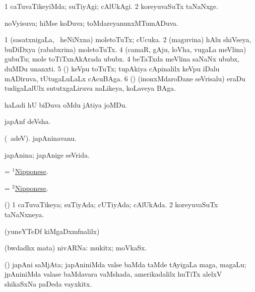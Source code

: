 \bentry
{}
\gl{\kirxvi}
\bmng
\bnum
\num{1} caTuvaTikeyiMda; suTiyAgi; cAlUkAgi. 
\num{2} koreyuvaSuTx taNaNxge. 
\enum
\emng
\eentry

\bentry
{}
\gl{\gu}
\bmng
noVyisuva; hiMse koDuva; toMdareyanunxMTumADuva. 
\emng
\eentry

\bentry
{}
\gl{\nA}
\bmng
\bnum
\num{1} (sasatxnigaLa, \kanmu\ heNiNxna) moletoTuTx; cUcuka. 
\num{2} (maguvina) hAlu shiVseya, buDiDxya (rababxrina) moletoTuTx. 
\num{4} (camaR, gAju, loVha, \mo vugaLa meVlina) gubuTu; mole toTiTxnAkArada ububx. 
\num{4} beTaTxda meVlina saNaNx ububx, duMDu unanxti. 
\num{5} (\ca) keVpu toTuTx; tupAkiya cApinalilx keVpu iDalu mADiruva, tUtugaLuLaLx cAcuBAga. 
\num{6} (\ame) (inonxMdaroDane seVrisalu) eraDu tudigaLalUlx sututxgaLiruva naLikeya, koLaveya BAga. 
\enum
\emng
\eentry

\bentry
{}
\gl{\nA}
\bmng
haLadi hU biDuva oMdu jAtiya joMDu. 
\emng
\eentry

\bentry
{}
\gl{\nA}
\bmng
japAnf deVsha. 
\emng
\eentry

\bentry
{}
\gl{\nA}
\bmng
(\bava\ adeV). japAninavanu. 
\emng
\eentry

\bentry
{}
\gl{\gu}
\bmng
japAnina; japAnige seVrida. 
\emng
\eentry

\bentry
{}
\gl{\nA}
\bmng
= \hyperlink{Nipponese(1)}{$^1$Nipponese}. 
\emng
\eentry

\bentry
{}
\gl{\gu}
\bmng
= \hyperlink{Nipponese(2)}{$^2$Nipponese}. 
\emng
\eentry

\bentry
{}
\gl{\gu}
\bmng
(\AmA) 
\bnum
\num{1} caTuvaTikeya; suTiyAda; cUTiyAda; cAlUkAda. 
\num{2} koreyuvaSuTx taNaNxneya. 
\enum
\emng
\eentry

\bentry
{}
\gl{\saMkiSx}
\bmng
(yuneYTeDf kiMgaDxmfnalilx)  
\emng
\eentry

\bentry
{}
\gl{\nA}
\bmng
(bwdadhx mata) nivARNa: mukitx; moVkaSx. 
\emng
\eentry

\bentry
{}
\gl{\nA}
\bmng
(\ame) japAni saMjAta; japAniniMda valse baMda taMde tAyigaLa maga, magaLu; jpAniniMda valase baMdavara vaMshada, amerikadalilx huTiTx alelxV shikaSxNa paDeda vayxkitx. 
\emng
\eentry

